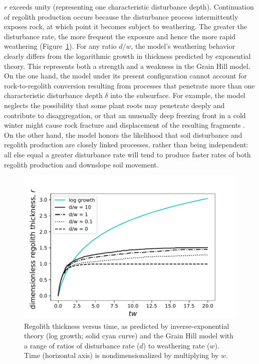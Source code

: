 \documentclass[esurf, manuscript]{copernicus}
\begin{document}
$r$ exceeds unity (representing one characteristic disturbance depth). Continuation of regolith production occurs because the disturbance process intermittently exposes rock, at which point it becomes subject to weathering. The greater the disturbance rate, the more frequent the exposure and hence the more rapid weathering (Figure~\ref{flatwxing}). For any ratio $d/w$, the model's weathering behavior clearly differs from the logarithmic growth in thickness predicted by exponential theory. This represents both a strength and a weakness in the Grain Hill model. On the one hand, the model under its present configuration cannot account for rock-to-regolith conversion resulting from processes that penetrate more than one characteristic disturbance depth $\delta$ into the subsurface. For example, the model neglects the possibility that some plant roots may penetrate deeply and contribute to disaggregation, or that an unusually deep freezing front in a cold winter might cause rock fracture and displacement of the resulting fragments \citep[e.g.,][]{anderson2012rock}. On the other hand, the model honors the likelihood that soil disturbance and regolith production are closely linked processes, rather than being independent: all else equal a greater disturbance rate will tend to produce faster rates of both regolith production and downslope soil movement.


\begin{figure}[t]
\includegraphics[width=12cm]{Figures/h_vs_t_flat_surf.pdf}
\caption{Regolith thickness versus time, as predicted by inverse-exponential theory (log growth; solid cyan curve) and the Grain Hill model with a range of ratios of disturbance rate ($d$) to weathering rate ($w$). Time (horizontal axis) is nondimensionalized by multiplying by $w$.}
\label{flatwxing}
\end{figure}
\end{document}
